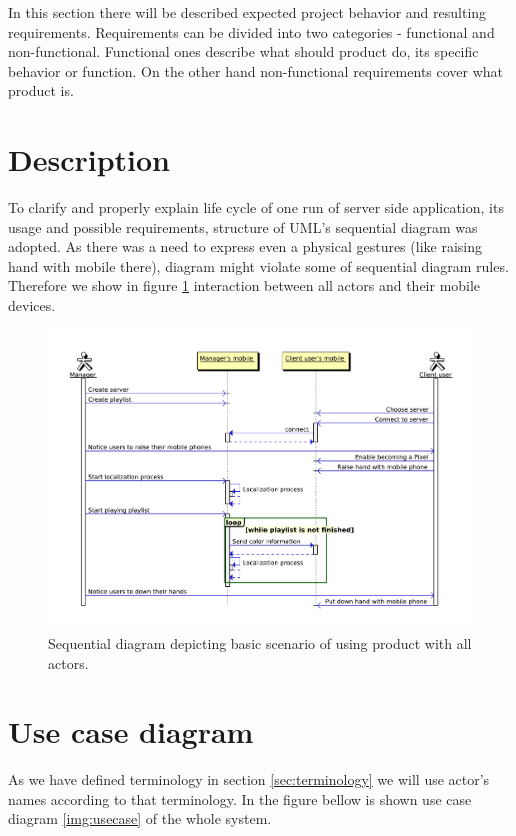 In this section there will be described expected project behavior and resulting requirements. 
Requirements can be divided into two categories - functional and non-functional. 
Functional ones describe what should product do, its specific behavior or function.
On the other hand non-functional requirements cover what product is.

\section{Description}
To clarify and properly explain life cycle of one run of server side application, its usage and possible requirements, structure of UML's sequential diagram was adopted. 
As there was a need to express even a physical gestures (like raising hand with mobile there), diagram might violate some of sequential diagram rules.
Therefore we show in figure \ref{img:wholeapp_seq} interaction between all actors and their mobile devices.

\begin{figure}[!h]
    \begin{center}
    \includegraphics[scale=0.4]{images/wholeapp_seq.pdf}
    \caption{Sequential diagram depicting basic scenario of using product with all actors.}
    \label{img:wholeapp_seq}
    \end{center}
\end{figure}


\section{Use case diagram}
As we have defined terminology in section \ref{sec:terminology} we will use actor's names according to that terminology.
In the figure bellow is shown use case diagram \ref{img:usecase} of the whole system.

